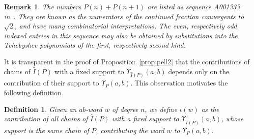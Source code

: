 \documentclass[reqno,12pt]{amsart}
\numberwithin{equation}{section}
\newtheorem{definition}[theorem]{Definition}
\newtheorem{remark}[theorem]{Remark}
\newcommand{\0}{\widehat{0}}
\newcommand{\1}{\widehat{1}}
\newcommand{\2}{\widehat{2}}
\newcommand{\grI}{\widehat{I}}
\newcommand{\iab}{\iota}
\begin{document}
\begin{remark}
{\em The numbers $P(n)+P(n+1)$ are listed as sequence
  A001333 in~\cite{OEIS}. They are known as the numerators of the
  continued fraction convergents to $\sqrt{2}$, and have many
  combinatorial interpretations. The even, respectively odd
  indexed entries in this sequence may also be obtained by substitutions
  into the Tchebyshev polynomials of the first, respectively second kind.}
\end{remark}

It is transparent in the proof of Proposition~\ref{prop:pell2}
that the contributions of chains of $\grI(P)$ with a fixed
support to $\Upsilon_{\grI(P)}(a,b)$ depends only on the contribution of
their support to $\Upsilon_{P}(a,b)$. This observation
motivates the following definition.
\begin{definition}
Given an $ab$-word $w$ of degree $n$, we define $\iab(w)$ as 
the contribution of all chains of $\grI(P)$ with a fixed
support to $\Upsilon_{\grI(P)}(a,b)$, whose support is the same chain
of $P$, contributing the word $w$ to $\Upsilon_{P}(a,b)$. 
\end{definition}  
\end{document}
